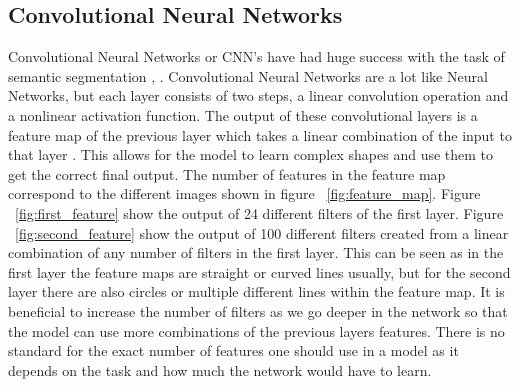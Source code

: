 \subsection{Convolutional Neural Networks}
Convolutional Neural Networks or CNN's have had huge success with the task of semantic segmentation \cite{Girshick_2014_CVPR}, \cite{Long_2015}. 
Convolutional Neural Networks are a lot like Neural Networks, but each layer consists of two steps, a linear convolution operation and a nonlinear activation function. 
The output of these convolutional layers is a feature map of the previous layer which takes a linear combination of the input to that layer \cite{Lee:2011:ULH:2001269.2001295}.
This allows for the model to learn complex shapes and use them to get the correct final output. 
The number of features in the feature map correspond to the different images shown in figure
~\ref{fig:feature_map}. 
Figure ~\ref{fig:first_feature} show the output of 24 different filters of the first layer. Figure ~\ref{fig:second_feature} show the output of 100 different filters created from a linear combination of any number of filters in the first layer. 
This can be seen as in the first layer the feature maps are straight or curved lines usually, but for the second layer there are also circles or multiple different lines within the feature map.
It is beneficial to increase the number of filters as we go deeper in the network so that the model can use more combinations of the previous layers features. 
There is no standard for the exact number of features one should use in a model as it depends on the task and how much the network would have to learn.

